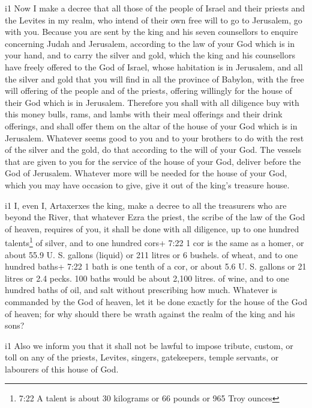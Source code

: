 i1 Now  I make a decree that all those of the people of
Israel and their priests and the Levites in my realm, who intend of
their own free will to go to Jerusalem, go with you. 
Because you are sent by the king and his seven counsellors to enquire
concerning Judah and Jerusalem, according to the law of your God which
is in your hand,  and to carry the silver and gold, which
the king and his counsellors have freely offered to the God of Israel,
whose habitation is in Jerusalem,  and all the silver and
gold that you will find in all the province of Babylon, with the free
will offering of the people and of the priests, offering willingly for
the house of their God which is in Jerusalem.  Therefore
you shall with all diligence buy with this money bulls, rams, and lambs
with their meal offerings and their drink offerings, and shall offer
them on the altar of the house of your God which is in Jerusalem.
 Whatever seems good to you and to your brothers to do with
the rest of the silver and the gold, do that according to the will of
your God.  The vessels that are given to you for the
service of the house of your God, deliver before the God of Jerusalem.
 Whatever more will be needed for the house of your God,
which you may have occasion to give, give it out of the king's treasure
house.

i1 I, even I, Artaxerxes the king, make a decree to all the
treasurers who are beyond the River, that whatever Ezra the priest, the
scribe of the law of the God of heaven, requires of you, it shall be
done with all diligence,  up to one hundred
talents\footnote{7:22 A talent is about 30 kilograms or 66 pounds or 965
  Troy ounces} of silver, and to one hundred cors+ 7:22 1 cor is the
same as a homer, or about 55.9 U. S. gallons (liquid) or 211 litres or 6
bushels. of wheat, and to one hundred baths+ 7:22 1 bath is one tenth of
a cor, or about 5.6 U. S. gallons or 21 litres or 2.4 pecks. 100 baths
would be about 2,100 litres. of wine, and to one hundred baths of oil,
and salt without prescribing how much.  Whatever is
commanded by the God of heaven, let it be done exactly for the house of
the God of heaven; for why should there be wrath against the realm of
the king and his sons?

i1 Also we inform you that it shall not be lawful to impose
tribute, custom, or toll on any of the priests, Levites, singers,
gatekeepers, temple servants, or labourers of this house of God.

